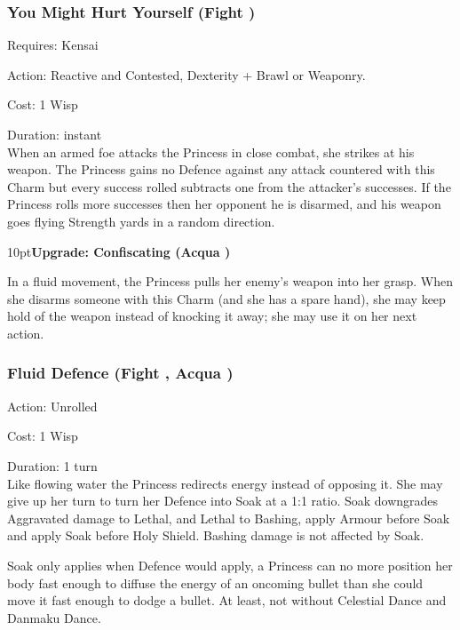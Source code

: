 \subsubsection*{You Might Hurt Yourself (Fight \textbullet\textbullet)}

\noindent Requires: Kensai 

\noindent Action: Reactive and Contested, Dexterity + Brawl or Weaponry.

\noindent Cost: 1 Wisp

\noindent Duration: instant \\

\noindent When an armed foe attacks the Princess in close combat, she strikes at his weapon. The Princess gains no Defence against any attack countered with this Charm but every success rolled subtracts one from the attacker's successes. If the Princess rolls more successes then her opponent he is disarmed, and his weapon goes flying Strength yards in a random direction.

\begin{myindentpar}{10pt}\textbf{Upgrade: Confiscating (Acqua \textbullet\textbullet\textbullet)}

In a fluid movement, the Princess pulls her enemy's weapon into her grasp. When she disarms someone with this Charm (and she has a spare hand), she may keep hold of the weapon instead of knocking it away; she may use it on her next action.\end{myindentpar}

\subsubsection*{Fluid Defence (Fight \textbullet\textbullet, Acqua \textbullet)}

\noindent Action: Unrolled

\noindent Cost: 1 Wisp

\noindent Duration: 1 turn\\

Like flowing water the Princess redirects energy instead of opposing it. She may give up her turn to turn her Defence into Soak at a 1:1 ratio. Soak downgrades Aggravated damage to Lethal, and Lethal to Bashing, apply Armour before Soak and apply Soak before Holy Shield. Bashing damage is not affected by Soak. 

Soak only applies when Defence would apply, a Princess can no more position her body fast enough to diffuse the energy of an oncoming bullet than she could move it fast enough to dodge a bullet. At least, not without Celestial Dance and Danmaku Dance.

